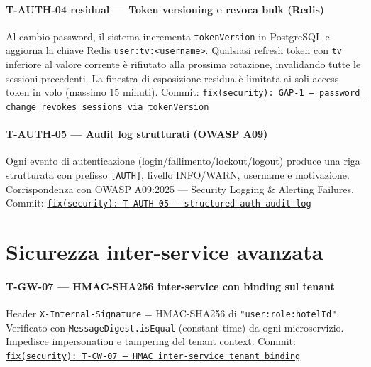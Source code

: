 ﻿\documentclass[a4paper,12pt]{report}
\newcommand{\commitref}[2]{\texttt{\small \href{https://github.com/diegoandruccioli/hotel-pms/commit/#1}{#2}}}
\begin{document}
\paragraph{T-AUTH-04 residual --- Token versioning e revoca bulk (Redis)}
Al cambio password, il sistema incrementa \texttt{tokenVersion} in PostgreSQL e
aggiorna la chiave Redis \texttt{user:tv:<username>}. Qualsiasi refresh token con
\texttt{tv} inferiore al valore corrente è rifiutato alla prossima rotazione,
invalidando tutte le sessioni precedenti. La finestra di esposizione residua è
limitata ai soli access token in volo (massimo 15 minuti).
Commit: \commitref{b473265}{fix(security): GAP-1 --- password change revokes sessions via tokenVersion}

\paragraph{T-AUTH-05 --- Audit log strutturati (OWASP A09)}
Ogni evento di autenticazione (login/fallimento/lockout/logout) produce una riga
strutturata con prefisso \texttt{[AUTH]}, livello INFO/WARN, username e motivazione.
Corrispondenza con OWASP A09:2025 --- Security Logging \& Alerting Failures.
Commit: \commitref{9a3d7f2}{fix(security): T-AUTH-05 --- structured auth audit log}

\section{Sicurezza inter-service avanzata}

\paragraph{T-GW-07 --- HMAC-SHA256 inter-service con binding sul tenant}
Header \texttt{X-Internal-Signature} = HMAC-SHA256 di \texttt{"user:role:hotelId"}.
Verificato con \texttt{MessageDigest.isEqual} (constant-time) da ogni microservizio.
Impedisce impersonation e tampering del tenant context.
Commit: \commitref{b469e21}{fix(security): T-GW-07 --- HMAC inter-service tenant binding}
\end{document}
